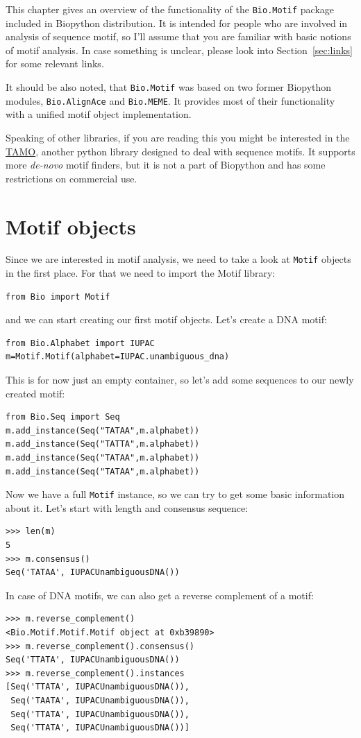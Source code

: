 \documentclass{report}
\begin{document}
This chapter gives an overview of the functionality of the
\verb|Bio.Motif| package included in Biopython distribution. It is intended
for people who are involved in analysis of sequence motif, so I'll
assume that you are familiar with basic notions of motif analysis. In
case something is unclear, please look into Section~\ref{sec:links}
for some relevant links.

It should be also noted, that \verb|Bio.Motif| was based on two
former Biopython modules, \verb|Bio.AlignAce| and \verb|Bio.MEME|. It provides
 most of their functionality with a unified motif object implementation.

Speaking of other libraries, if you are reading this you might be
interested in the \href{http://fraenkel.mit.edu/TAMO/}{TAMO}, another python library
designed to deal with sequence motifs. It supports more \emph{de-novo}
motif finders, but it is not a part of Biopython and has some restrictions
on commercial use.

\section{Motif objects}
\label{sec:object}
Since we are interested in motif analysis, we need to take a look at
\verb|Motif| objects in the first place. For that we need to import 
the Motif library:
\begin{verbatim}
from Bio import Motif
\end{verbatim}
and we can start creating our first motif objects. Let's create a DNA motif:
\begin{verbatim}
from Bio.Alphabet import IUPAC
m=Motif.Motif(alphabet=IUPAC.unambiguous_dna)
\end{verbatim}
This is for now just an empty container, so let's add some sequences to our newly created motif:
\begin{verbatim}
from Bio.Seq import Seq
m.add_instance(Seq("TATAA",m.alphabet))
m.add_instance(Seq("TATTA",m.alphabet))
m.add_instance(Seq("TATAA",m.alphabet))
m.add_instance(Seq("TATAA",m.alphabet))
\end{verbatim}
Now we have a full \verb|Motif| instance, so we can try to get some
basic information about it. Let's start with length and consensus
sequence:
\begin{verbatim}
>>> len(m)
5
>>> m.consensus()
Seq('TATAA', IUPACUnambiguousDNA())
\end{verbatim}
In case of DNA motifs, we can also get a reverse complement of a motif:
\begin{verbatim}
>>> m.reverse_complement()
<Bio.Motif.Motif.Motif object at 0xb39890>
>>> m.reverse_complement().consensus()
Seq('TTATA', IUPACUnambiguousDNA())
>>> m.reverse_complement().instances  
[Seq('TTATA', IUPACUnambiguousDNA()), 
 Seq('TAATA', IUPACUnambiguousDNA()), 
 Seq('TTATA', IUPACUnambiguousDNA()), 
 Seq('TTATA', IUPACUnambiguousDNA())]
\end{verbatim}
\end{document}
